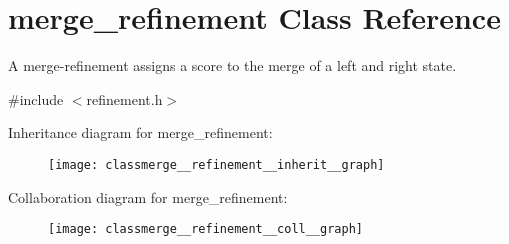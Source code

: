 \hypertarget{classmerge__refinement}{}\section{merge\+\_\+refinement Class Reference}
\label{classmerge__refinement}


A merge-\/refinement assigns a score to the merge of a left and right state.  




{\ttfamily \#include $<$refinement.\+h$>$}



Inheritance diagram for merge\+\_\+refinement\+:
\nopagebreak
\begin{figure}[H]
\begin{center}
\leavevmode
\texttt{[image: classmerge\_\_refinement\_\_inherit\_\_graph]}
\end{center}
\end{figure}


Collaboration diagram for merge\+\_\+refinement\+:
\nopagebreak
\begin{figure}[H]
\begin{center}
\leavevmode
\texttt{[image: classmerge\_\_refinement\_\_coll\_\_graph]}
\end{center}
\end{figure}
